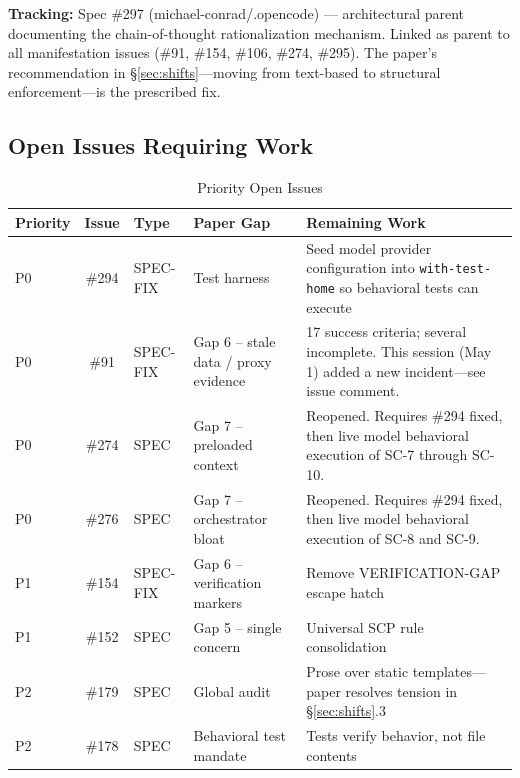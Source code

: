\documentclass[11pt,a4paper]{article}
\begin{document}
\textbf{Tracking:} Spec \#297 (michael-conrad/.opencode) --- architectural parent documenting the chain-of-thought rationalization mechanism.  Linked as parent to all manifestation issues (\#91, \#154, \#106, \#274, \#295).  The paper's recommendation in \S\ref{sec:shifts}---moving from text-based to structural enforcement---is the prescribed fix.

\subsection{Open Issues Requiring Work}

\begin{table}[htbp]
\centering
\caption{Priority Open Issues}
\small
\begin{tabular}{@{}p{0.8cm}clp{4cm}p{4.5cm}@{}}
\toprule
\textbf{Priority} & \textbf{Issue} & \textbf{Type} & \textbf{Paper Gap} & \textbf{Remaining Work} \\
\midrule
P0 & \#294 & SPEC-FIX & Test harness & Seed model provider configuration into \texttt{with-test-home} so behavioral tests can execute \\
\midrule
P0 & \#91 & SPEC-FIX & Gap 6 -- stale data / proxy evidence & 17 success criteria; several incomplete.  This session (May 1) added a new incident---see issue comment. \\
\midrule
P0 & \#274 & SPEC & Gap 7 -- preloaded context & Reopened.  Requires \#294 fixed, then live model behavioral execution of SC-7 through SC-10. \\
\midrule
P0 & \#276 & SPEC & Gap 7 -- orchestrator bloat & Reopened.  Requires \#294 fixed, then live model behavioral execution of SC-8 and SC-9. \\
\midrule
P1 & \#154 & SPEC-FIX & Gap 6 -- verification markers & Remove VERIFICATION-GAP escape hatch \\
\midrule
P1 & \#152 & SPEC & Gap 5 -- single concern & Universal SCP rule consolidation \\
\midrule
P2 & \#179 & SPEC & Global audit & Prose over static templates---paper resolves tension in \S\ref{sec:shifts}.3 \\
\midrule
P2 & \#178 & SPEC & Behavioral test mandate & Tests verify behavior, not file contents \\
\bottomrule
\end{tabular}
\end{table}

\newpage
\end{document}
